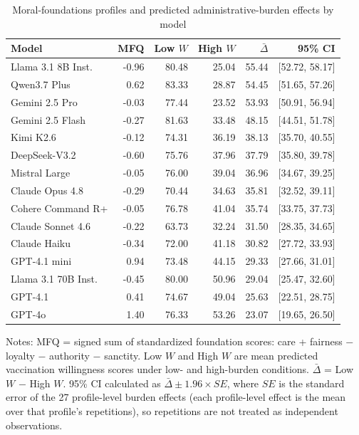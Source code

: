 \documentclass[12pt,a4paper]{article}
\begin{document}
\begin{table}[htbp]
\centering
\caption{Moral-foundations profiles and predicted administrative-burden effects by model}
\label{tab:orientation_burden}
\small
\begin{tabular*}{\textwidth}{@{\extracolsep{\fill}}L{3.5cm}rrrrr@{}}
\toprule
Model & MFQ & Low $W$ & High $W$ & $\bar{\Delta}$ & 95\% CI \\
\midrule
Llama 3.1 8B Inst. & -0.96 & 80.48 & 25.04 & 55.44 & [52.72, 58.17] \\
Qwen3.7 Plus & 0.62 & 83.33 & 28.87 & 54.45 & [51.65, 57.26] \\
Gemini 2.5 Pro & -0.03 & 77.44 & 23.52 & 53.93 & [50.91, 56.94] \\
Gemini 2.5 Flash & -0.27 & 81.63 & 33.48 & 48.15 & [44.51, 51.78] \\
Kimi K2.6 & -0.12 & 74.31 & 36.19 & 38.13 & [35.70, 40.55] \\
DeepSeek-V3.2 & -0.60 & 75.76 & 37.96 & 37.79 & [35.80, 39.78] \\
Mistral Large & -0.05 & 76.00 & 39.04 & 36.96 & [34.67, 39.25] \\
Claude Opus 4.8 & -0.29 & 70.44 & 34.63 & 35.81 & [32.52, 39.11] \\
Cohere Command R+ & -0.05 & 76.78 & 41.04 & 35.74 & [33.75, 37.73] \\
Claude Sonnet 4.6 & -0.22 & 63.73 & 32.24 & 31.50 & [28.35, 34.65] \\
Claude Haiku & -0.34 & 72.00 & 41.18 & 30.82 & [27.72, 33.93] \\
GPT-4.1 mini & 0.94 & 73.48 & 44.15 & 29.33 & [27.66, 31.01] \\
Llama 3.1 70B Inst. & -0.45 & 80.00 & 50.96 & 29.04 & [25.47, 32.60] \\
GPT-4.1 & 0.41 & 74.67 & 49.04 & 25.63 & [22.51, 28.75] \\
GPT-4o & 1.40 & 76.33 & 53.26 & 23.07 & [19.65, 26.50] \\
\bottomrule
\end{tabular*}
\begin{flushleft}
\footnotesize Notes: MFQ = signed sum of standardized foundation scores: care + fairness $-$ loyalty $-$ authority $-$ sanctity. Low $W$ and High $W$ are mean predicted vaccination willingness scores under low- and high-burden conditions. $\bar{\Delta}$ = Low $W$ $-$ High $W$. 95\% CI calculated as $\bar{\Delta} \pm 1.96 \times SE$, where $SE$ is the standard error of the 27 profile-level burden effects (each profile-level effect is the mean over that profile's repetitions), so repetitions are not treated as independent observations.
\end{flushleft}
\end{table}
\end{document}
